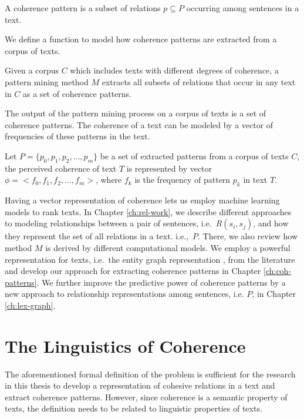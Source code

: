 \begin{definition}
\label{def:def-coh-pattern}
A coherence pattern is a subset of relations $p \subseteq P$ occurring among sentences in a text.   
\end{definition}

We define a function to model how coherence patterns are extracted from a corpus of texts. 

\begin{definition}
Given a corpus $C$ which includes texts with different degrees of coherence, a pattern mining method $M$ extracts all subsets of relations that occur in any text in $C$ as a set of coherence patterns. 
\end{definition} 

The output of the pattern mining process on a corpus of texts is a set of coherence patterns. 
The coherence of a text can be modeled by a vector of frequencies of these patterns in the text. 

\begin{definition}
Let $P=\lbrace p_0,p_1,p_2,...,p_m \rbrace$ be a set of extracted patterns from a corpus of texts $C$, the perceived coherence of text $T$ is represented by  vector $\phi = <f_0, f_1, f_2,...,f_m>$, where $f_k$ is the frequency of pattern $p_k$ in text $T$. 
\end{definition}

Having a vector representation of coherence lets us employ machine learning models to rank texts. 
In Chapter \ref{ch:rel-work}, we describe different approaches to modeling relationships between a pair of sentences, i.e.\ $R(s_i,s_j)$, and how they represent the set of all relations in a text. i.e.,\ $P$.  
There, we also review how method $M$ is derived by different computational models. 
We employ a powerful representation for texts, i.e.\ the entity graph representation \cite{guinaudeau13}, from the literature and develop our approach for extracting coherence patterns in Chapter \ref{ch:coh-patterns}. 
We further improve the predictive power of coherence patterns by a new approach to relationship representations among sentences, i.e. $P$, in Chapter \ref{ch:lex-graph}. 

\section{The Linguistics of Coherence}

The aforementioned formal definition of the problem is sufficient for the research in this thesis to develop a representation of cohesive relations in a text and extract coherence patterns. 
However, since coherence is a semantic property of texts, the definition needs to be related to linguistic properties of texts. 

